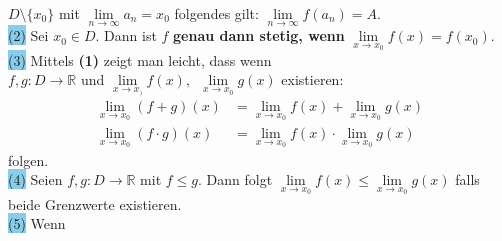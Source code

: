 \documentclass[landscape, 10pt]{article}
\newcommand{\R}{\mathbb{R}}
\begin{document}
\begin{multicols}{3}
{                            $D\setminus\{x_0\}$} mit 
                            \textcolor{NavyBlue}{
                            $\lim\limits_{n\to\infty}a_n=x_0$} 
                            folgendes gilt: 
                            \textcolor{NavyBlue}{
                            $\lim\limits_{n\to\infty}f(a_n)=A$}.\\ 
                     \colorbox{SkyBlue}{(2)}
                            Sei \textcolor{NavyBlue}{$x_0\in D$}. 
                            Dann ist \textcolor{NavyBlue}{$f$} 
                            \textbf{genau dann stetig, wenn} 
                            \textcolor{NavyBlue}{
                            $\lim\limits_{x\to x_0}f(x)=f(x_0)$}.\\
                     \colorbox{SkyBlue}{(3)} 
                            Mittels \textbf{(1)} zeigt man leicht, 
                            dass wenn \\
                            \textcolor{NavyBlue}{
                            $f,g:D\longrightarrow\R$} 
                            und 
                            \textcolor{NavyBlue}{
                            $\lim\limits_{x\to x_)}f(x),$\,
                            $\lim\limits_{x\to x_0}g(x)$}
                            existieren: 
                            \begin{align*}
                                   \lim\limits_{x\to x_0}(f+g)(x)
                                   &=\lim\limits_{x\to x_0}f(x)
                                   +\lim\limits_{x\to x_0}g(x)\\
                                   \lim\limits_{x\to x_0}(f\cdot g)(x)
                                   &=\lim\limits_{x\to x_0}f(x)
                                   \cdot\lim\limits_{x\to x_0}g(x)
                            \end{align*}
                            folgen.\\
                     \colorbox{SkyBlue}{(4)} 
                            Seien \textcolor{NavyBlue}{
                            $f,g:D\longrightarrow\R$} mit 
                            \textcolor{NavyBlue}{
                            $f\leqslant g$}. Dann folgt 
                            \textcolor{NavyBlue}{
                            $\lim\limits_{x\to x_0}f(x)
                            \leqslant\lim\limits_{x\to x_0}g(x)$}
                            falls beide Grenzwerte existieren.\\
                     \colorbox{SkyBlue}{(5)} 
                            Wenn \textcolor{NavyBlue}{
}
\end{multicols}
\end{document}

